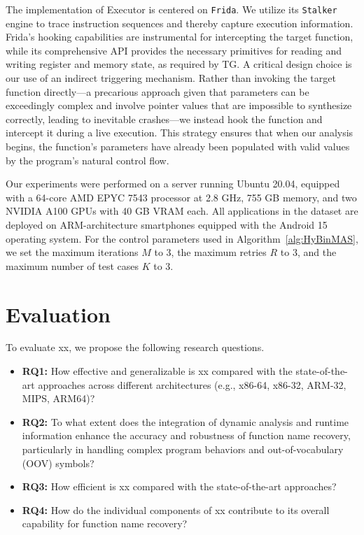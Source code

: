 \documentclass[acmsmall,screen,review,anonymous]{acmart} %
\begin{document}
The implementation of Executor is centered on \texttt{Frida}. We utilize its \texttt{Stalker} engine to trace instruction sequences and thereby capture execution information. Frida's hooking capabilities are instrumental for intercepting the target function, while its comprehensive API provides the necessary primitives for reading and writing register and memory state, as required by TG. A critical design choice is our use of an indirect triggering mechanism. Rather than invoking the target function directly---a precarious approach given that parameters can be exceedingly complex and involve pointer values that are impossible to synthesize correctly, leading to inevitable crashes---we instead hook the function and intercept it during a live execution. This strategy ensures that when our analysis begins, the function's parameters have already been populated with valid values by the program's natural control flow.

Our experiments were performed on a server running Ubuntu 20.04, equipped with a 64-core AMD EPYC 7543 processor at 2.8 GHz, 755 GB memory, and two NVIDIA A100 GPUs with 40 GB VRAM each. All applications in the dataset are deployed on ARM-architecture smartphones equipped with the Android 15 operating system. For the control parameters used in Algorithm~\ref{alg:HyBinMAS}, we set the maximum iterations $M$ to 3, the maximum retries $R$ to 3, and the maximum number of test cases $K$ to 3.


\section{Evaluation}
To evaluate xx, we propose the following research questions.
\begin{itemize}
    \item \textbf{RQ1:} How effective and generalizable is xx compared with the state-of-the-art approaches across different architectures (e.g., x86-64, x86-32, ARM-32, MIPS, ARM64)?
    \item \textbf{RQ2:} To what extent does the integration of dynamic analysis and runtime information enhance the accuracy and robustness of function name recovery, particularly in handling complex program behaviors and out-of-vocabulary (OOV) symbols?
    \item \textbf{RQ3:} How efficient is xx compared with the state-of-the-art approaches? %
    \item \textbf{RQ4:} How do the individual components of xx contribute to its overall capability for function name recovery? %
\end{itemize}
\end{document}

